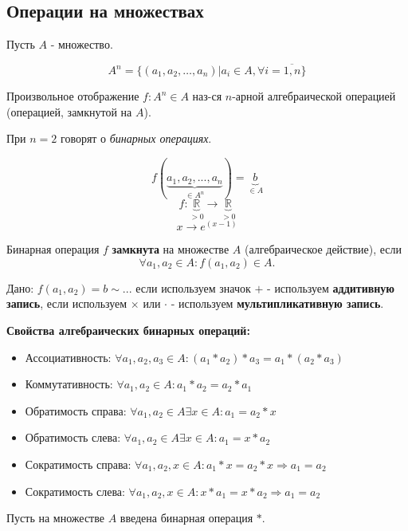 \subsection{Операции на множествах}

Пусть $A$ - множество.

\[ A^n = \{ (a_1, a_2, \dots, a_n) | a_i \in A, \forall i = \overline{1, n} \} \]

\begin{definition}
	Произвольное отображение $f: A^n \in A$ наз-ся $n$-арной алгебраической операцией (операцией, замкнутой на $A$).
	
	При $n = 2$ говорят о \textit{бинарных операциях}.
	
	\[ f(\underbrace{a_1, a_2,...,a_n}_{\in A^n}) = \underbrace{b}_{\in A} \]
	\[ f: \underbrace{\mathbb{R}}_{>0} \to \underbrace{\mathbb{R}}_{>0} \]
	\[ x \to e^{(x-1)} \]
\end{definition}

\begin{definition}
	Бинарная операция $f$ \textbf{замкнута} на множестве $A$ (алгебраическое действие), если
	\[ \forall a_1, a_2 \in A: f(a_1, a_2) \in A. \]
\end{definition}

Дано: $f(a_1, a_2) = b \sim ...$ если используем значок $+$ - используем \textbf{аддитивную запись}, если используем $\times$ или $\cdot$ - используем \textbf{мультипликативную запись}.

\textbf{Свойства алгебраических бинарных операций:}

\begin{itemize}
	\item Ассоциативность: $\forall a_1, a_2, a_3 \in A: (a_1 * a_2) * a_3 = a_1 * (a_2 * a_3)$
	\item Коммутативность: $\forall a_1, a_2 \in A: a_1 * a_2 = a_2 * a_1$
	\item Обратимость справа: $\forall a_1, a_2 \in A \exists x \in A: a_1 = a_2 * x$
	\item Обратимость слева: $\forall a_1, a_2 \in A \exists x \in A: a_1 = x * a_2$
	\item Сократимость справа: $\forall a_1, a_2, x \in A: a_1 * x = a_2 * x \Rightarrow a_1 = a_2$
	\item Сократимость слева: $\forall a_1, a_2, x \in A: x * a_1 = x * a_2 \Rightarrow a_1 = a_2$
\end{itemize}

Пусть на множестве $A$ введена бинарная операция $*$.

